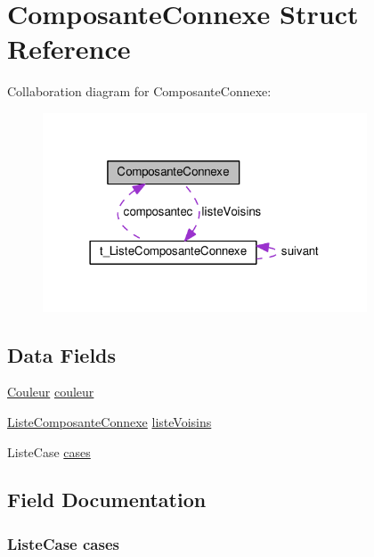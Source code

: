\hypertarget{struct_composante_connexe}{}\section{Composante\+Connexe Struct Reference}
\label{struct_composante_connexe}


Collaboration diagram for Composante\+Connexe\+:\nopagebreak
\begin{figure}[H]
\begin{center}
\leavevmode
\includegraphics[width=273pt]{struct_composante_connexe__coll__graph}
\end{center}
\end{figure}
\subsection*{Data Fields}
\begin{DoxyCompactItemize}
\item 
\hyperlink{_grille_8c_aa304d0ca681f782b1d7735da33037dd7}{Couleur} \hyperlink{struct_composante_connexe_af0e152d09c13944935e00bef7a3c5111}{couleur}
\item 
\hyperlink{_liste_composante_connexe_8h_a8002dafd0bddf66157ac8cf6e811e4e7}{Liste\+Composante\+Connexe} \hyperlink{struct_composante_connexe_a7c2f71b57647800daa49d283625d1a03}{liste\+Voisins}
\item 
Liste\+Case \hyperlink{struct_composante_connexe_a80edb9cf5135b7f7d3f059d71af4f6cd}{cases}
\end{DoxyCompactItemize}


\subsection{Field Documentation}
\subsubsection[{\texorpdfstring{cases}{cases}}]{\setlength{\rightskip}{0pt plus 5cm}Liste\+Case cases}\hypertarget{struct_composante_connexe_a80edb9cf5135b7f7d3f059d71af4f6cd}{}\label{struct_composante_connexe_a80edb9cf5135b7f7d3f059d71af4f6cd}
